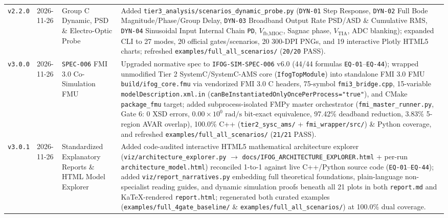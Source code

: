 \documentclass[11pt,a4paper]{article}
\begin{document}
\begin{tabularx}{\textwidth}{@{}p{1.4cm} p{2.0cm} p{3.2cm} X@{}}
\texttt{v2.2.0} & 2026-11-26 & Group C Dynamic, PSD \& Electro-Optic Probe & Added \texttt{tier3\_analysis/scenarios\_dynamic\_probe.py} (\texttt{DYN-01} Step Response, \texttt{DYN-02} Full Bode Magnitude/Phase/Group Delay, \texttt{DYN-03} Broadband Output Rate PSD/ASD \& Cumulative RMS, \texttt{DYN-04} Sinusoidal Input Internal Chain \texttt{PD}, $V_{\text{fb,MIOC}}$, Sagnac phase, $V_{\text{TIA}}$, ADC blanking); expanded CLI to 27 modes, 20 official gates/scenarios, 20 300-DPI PNGs, and 19 interactive Plotly HTML5 charts; refreshed \texttt{examples/full\_all\_scenarios/} (\texttt{20/20} PASS). \\
\texttt{v3.0.0} & 2026-11-26 & \texttt{SPEC-006} FMI 3.0 Co-Simulation FMU & Upgraded normative spec to \texttt{IFOG-SIM-SPEC-006} v6.0 (44/44 formulas \texttt{EQ-01}--\texttt{EQ-44}); wrapped unmodified Tier 2 SystemC/SystemC-AMS core (\texttt{IfogTopModule}) into standalone FMI 3.0 FMU \texttt{build/ifog\_core.fmu} via vendorized FMI 3.0 C headers, 75-symbol \texttt{fmi3\_bridge.cpp}, 15-variable \texttt{modelDescription.xml.in} (\texttt{canBeInstantiatedOnlyOncePerProcess="true"}), and CMake \texttt{package\_fmu} target; added subprocess-isolated FMPy master orchestrator (\texttt{fmi\_master\_runner.py}, Gate 6: 0 XSD errors, $0.00\times 10^{0}\text{ rad/s}$ bit-exact equivalence, 97.42\% deadband reduction, 3.83\% 5-region AVAR overlap), 100.0\% C++ (\texttt{tier2\_sysc\_ams/} + \texttt{fmi\_wrapper/src/}) \& Python coverage, and refreshed \texttt{examples/full\_all\_scenarios/} (\texttt{21/21} PASS). \\
\texttt{v3.0.1} & 2026-11-26 & Standardized Explanatory Reports \& HTML Model Explorer & Added code-audited interactive HTML5 mathematical architecture explorer (\texttt{viz/architecture\_explorer.py} $\to$ \texttt{docs/IFOG\_ARCHITECTURE\_EXPLORER.html} + per-run \texttt{architecture\_model.html}) reconciled 1-to-1 against live C++/Python source code (\texttt{EQ-01}--\texttt{EQ-44}); added \texttt{viz/report\_narratives.py} embedding full theoretical foundations, plain-language non-specialist reading guides, and dynamic simulation proofs beneath all 21 plots in both \texttt{report.md} and KaTeX-rendered \texttt{report.html}; regenerated both curated examples (\texttt{examples/full\_4gate\_baseline/} \& \texttt{examples/full\_all\_scenarios/}) at 100.0\% dual coverage. \\

\end{tabularx}
\end{document}
